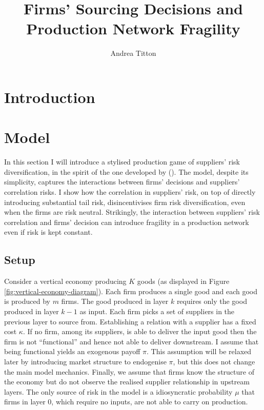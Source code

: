 \documentclass[american, abstract=on]{scrartcl}
\author{Andrea Titton}
\title{Firms' Sourcing Decisions and\\ Production Network Fragility}
\theoremstyle{plain}
\newcommand{\citein}[1]{\citeauthor{#1} (\citeyear{#1})}
\begin{document}
\maketitle
\section{Introduction}

\section{Model}

In this section I will introduce a stylised production game of suppliers' risk diversification, in the spirit of the one developed by \citein{elliott_supply_2022}. The model, despite its simplicity, captures the interactions between firms’ decisions and suppliers’ correlation risks. I show how the correlation in suppliers’ risk, on top of directly introducing substantial tail risk, disincentivises firm risk diversification, even when the firms are risk neutral. Strikingly, the interaction between suppliers’ risk correlation and firms’ decision can introduce fragility in a production network even if risk is kept constant.

\subsection{Setup}

Consider a vertical economy producing $K$ goods (as displayed in Figure \ref{fig:vertical-economy-diagram}). Each firm produces a single good and each good is produced by $m$ firms. The good produced in layer $k$ requires only the good produced in layer $k - 1$ as input. Each firm picks a set of suppliers in the previous layer to source from. Establishing a relation with a supplier has a fixed cost $\kappa$. If no firm, among its suppliers, is able to deliver the input good then the firm is not ``functional'' and hence not able to deliver downstream. I assume that being functional yields an exogenous payoff $\pi$. This assumption will be relaxed later by introducing market structure to endogenise $\pi$, but this does not change the main model mechanics. Finally, we assume that firms know the structure of the economy but do not observe the realised supplier relationship in upstream layers. The only source of risk in the model is a idiosyncratic probability $\mu$ that firms in layer $0$, which require no inputs, are not able to carry on production.
\end{document}
